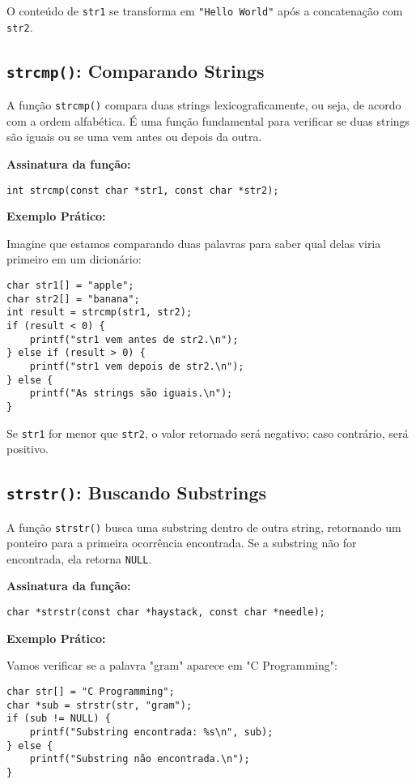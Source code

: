 \documentclass[12pt]{article}
\begin{document}
O conteúdo de \texttt{str1} se transforma em \texttt{"Hello World"} após a concatenação com \texttt{str2}.

\subsection{\texttt{strcmp()}: Comparando Strings}
A função \texttt{strcmp()} compara duas strings lexicograficamente, ou seja, de acordo com a ordem alfabética. É uma função fundamental para verificar se duas strings são iguais ou se uma vem antes ou depois da outra.

\textbf{Assinatura da função:}

\begin{lstlisting}
int strcmp(const char *str1, const char *str2);
\end{lstlisting}

\textbf{Exemplo Prático:}

Imagine que estamos comparando duas palavras para saber qual delas viria primeiro em um dicionário:

\begin{lstlisting}
char str1[] = "apple";
char str2[] = "banana";
int result = strcmp(str1, str2);
if (result < 0) {
    printf("str1 vem antes de str2.\n");
} else if (result > 0) {
    printf("str1 vem depois de str2.\n");
} else {
    printf("As strings são iguais.\n");
}
\end{lstlisting}

Se \texttt{str1} for menor que \texttt{str2}, o valor retornado será negativo; caso contrário, será positivo.

\subsection{\texttt{strstr()}: Buscando Substrings}
A função \texttt{strstr()} busca uma substring dentro de outra string, retornando um ponteiro para a primeira ocorrência encontrada. Se a substring não for encontrada, ela retorna \texttt{NULL}.

\textbf{Assinatura da função:}

\begin{lstlisting}
char *strstr(const char *haystack, const char *needle);
\end{lstlisting}

\textbf{Exemplo Prático:}

Vamos verificar se a palavra "gram" aparece em "C Programming":

\begin{lstlisting}
char str[] = "C Programming";
char *sub = strstr(str, "gram");
if (sub != NULL) {
    printf("Substring encontrada: %s\n", sub);
} else {
    printf("Substring não encontrada.\n");
}
\end{lstlisting}
\end{document}
